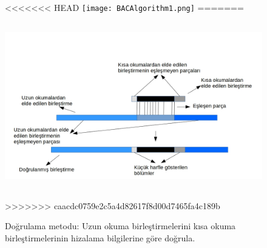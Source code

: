 \begin{figure}[htb]
\begin{center}
<<<<<<< HEAD
  \texttt{[image: BACAlgorithm1.png]}
=======
  \includegraphics[width=14cm, height=8cm]{BACAlgorithmTurkce.jpg}
>>>>>>> caacdc0759e2c5a4d82617f8d00d7465fa4c189b
\end{center}
  \caption{Doğrulama metodu: Uzun okuma birleştirmelerini kısa okuma birleştirmelerinin hizalama bilgilerine göre doğrula.}
  \label{correction}
\end{figure}







